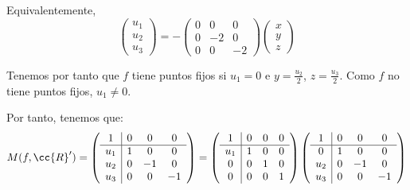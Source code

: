 \begin{enumerate}
\begin{enumerate}
        Equivalentemente,
        \begin{equation*}
            \left(\begin{array}{c}
                u_1 \\ u_2 \\ u_3
            \end{array}\right)
            = -\left(\begin{array}{ccc}
                0 & 0 & 0\\ 
                0 & -2 & 0 \\
                0 & 0 & -2
            \end{array}\right)
            \left(\begin{array}{c}
                x \\ y \\ z
            \end{array}\right)
        \end{equation*}
    
        Tenemos por tanto que $f$ tiene puntos fijos si $u_1=0$ e $y=\frac{u_2}{2}$, $z=\frac{u_3}{2}$. Como $f$ no tiene puntos fijos, $u_1\neq 0$.

        Por tanto, tenemos que:
        \begin{equation*}
            M(f,\cc{R}') = \left(\begin{array}{c|ccc}
                1 & 0 & 0 & 0 \\ \hline
                u_1 & 1 & 0 & 0\\ 
                u_2 & 0 & -1 & 0 \\
                u_3 & 0 & 0 & -1
            \end{array}\right)
            =
             \left(\begin{array}{c|ccc}
                1 & 0 & 0 & 0 \\ \hline
                u_1 & 1 & 0 & 0\\ 
                0 & 0 & 1 & 0 \\
                0 & 0 & 0 & 1
            \end{array}\right)
             \left(\begin{array}{c|ccc}
                1 & 0 & 0 & 0 \\ \hline
                0 & 1 & 0 & 0\\ 
                u_2 & 0 & -1 & 0 \\
                u_3 & 0 & 0 & -1
            \end{array}\right)
        \end{equation*}


\end{enumerate}
\end{enumerate}
